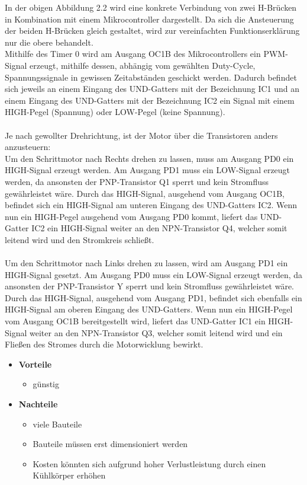 In der obigen Abbildung 2.2 wird eine konkrete Verbindung von zwei H-Brücken in Kombination mit einem Mikrocontroller dargestellt.
Da sich die Ansteuerung der beiden H-Brücken gleich gestaltet, wird zur vereinfachten Funktionserklärung nur die obere behandelt. \\
Mithilfe des Timer 0 wird am Ausgang OC1B des Mikrocontrollers ein PWM-Signal erzeugt, mithilfe dessen, abhängig vom gewählten Duty-Cycle, Spannungssignale in gewissen Zeitabständen geschickt werden.
Dadurch befindet sich jeweils an einem Eingang des UND-Gatters mit der Bezeichnung IC1 und an einem Eingang des UND-Gatters mit der Bezeichnung IC2 ein Signal mit einem HIGH-Pegel (Spannung) oder
LOW-Pegel (keine Spannung). \\\\
Je nach gewollter Drehrichtung, ist der Motor über die Transistoren anders anzusteuern: \\
Um den Schrittmotor nach Rechts drehen zu lassen, muss am Ausgang PD0 ein HIGH-Signal erzeugt werden.
Am Ausgang PD1 muss ein LOW-Signal erzeugt werden, da ansonsten der PNP-Transistor Q1 sperrt und kein Stromfluss gewährleistet wäre.
Durch das HIGH-Signal, ausgehend vom Ausgang OC1B, befindet sich ein HIGH-Signal am unteren Eingang des UND-Gatters IC2.
Wenn nun ein HIGH-Pegel ausgehend vom Ausgang PD0 kommt, liefert das UND-Gatter IC2 ein HIGH-Signal weiter an den NPN-Transistor Q4, welcher somit leitend wird und den Stromkreis schließt. \\\\
Um den Schrittmotor nach Links drehen zu lassen, wird am Ausgang PD1 ein HIGH-Signal gesetzt.
Am Ausgang PD0 muss ein LOW-Signal erzeugt werden, da ansonsten der PNP-Transistor Y sperrt und kein Stromfluss gewährleistet wäre.
Durch das HIGH-Signal, ausgehend vom Ausgang PD1, befindet sich ebenfalls ein HIGH-Signal am oberen Eingang des UND-Gatters.
Wenn nun ein HIGH-Pegel vom Ausgang OC1B bereitgestellt wird, liefert das UND-Gatter IC1 ein HIGH-Signal weiter an den NPN-Transistor Q3, welcher somit leitend wird und
ein Fließen des Stromes durch die Motorwicklung bewirkt.

\begin{itemize}
    \item \textbf{Vorteile}
    \begin{itemize}
        \item günstig
    \end{itemize}
    \item \textbf{Nachteile}
    \begin{itemize}
        \item viele Bauteile
        \item Bauteile müssen erst dimensioniert werden
        \item Kosten könnten sich aufgrund hoher Verlustleistung durch einen Kühlkörper erhöhen
    \end{itemize}
\end{itemize}


